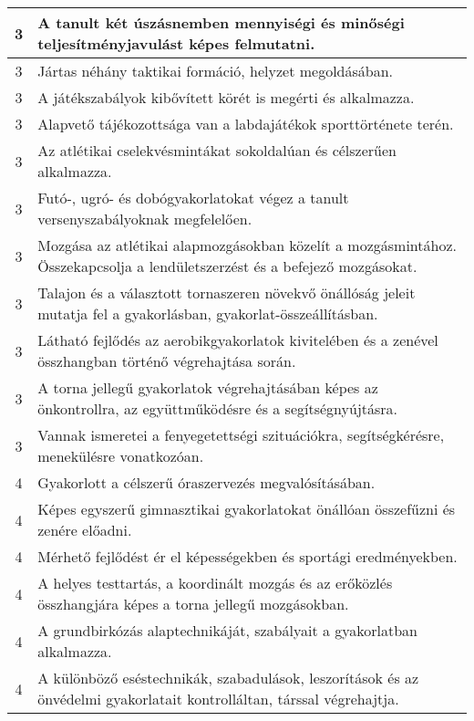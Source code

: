 \begin{longtable}{c | p{12cm} }
                                
                                          3 &  A tanult két úszásnemben mennyiségi és minőségi teljesítményjavulást képes felmutatni. \\ \hline
                                          3 &  Jártas néhány taktikai formáció, helyzet megoldásában. \\ \hline
                                          3 &  A játékszabályok kibővített körét is megérti és alkalmazza. \\ \hline
                                          3 &  Alapvető tájékozottsága van a labdajátékok sporttörténete terén. \\ \hline
                                          3 &  Az atlétikai cselekvésmintákat sokoldalúan és célszerűen alkalmazza. \\ \hline
                                          3 &  Futó-, ugró- és dobógyakorlatokat végez a tanult versenyszabályoknak megfelelően. \\ \hline
                                          3 &  Mozgása az atlétikai alapmozgásokban közelít a mozgásmintához. Összekapcsolja a lendületszerzést és a befejező mozgásokat. \\ \hline
                                          3 &  Talajon és a választott tornaszeren növekvő önállóság jeleit mutatja fel a gyakorlásban, gyakorlat-összeállításban. \\ \hline
                                          3 &  Látható fejlődés az aerobikgyakorlatok kivitelében és a zenével összhangban történő végrehajtása során. \\ \hline
                                          3 &  A torna jellegű gyakorlatok végrehajtásában képes az önkontrollra, az együttműködésre és a segítségnyújtásra. \\ \hline
                                          3 &  Vannak ismeretei a fenyegetettségi szituációkra, segítségkérésre, menekülésre vonatkozóan. \\ \hline
                                      
                                
                                          4 &  Gyakorlott a célszerű óraszervezés megvalósításában. \\ \hline
                                          4 &  Képes egyszerű gimnasztikai gyakorlatokat önállóan összefűzni és zenére előadni. \\ \hline
                                          4 &  Mérhető fejlődést ér el képességekben és sportági eredményekben. \\ \hline
                                          4 &  A helyes testtartás, a koordinált mozgás és az erőközlés összhangjára képes a torna jellegű mozgásokban. \\ \hline
                                          4 &  A grundbirkózás alaptechnikáját, szabályait a gyakorlatban alkalmazza. \\ \hline
                                          4 &  A különböző eséstechnikák, szabadulások, leszorítások és az önvédelmi gyakorlatait kontrolláltan, társsal végrehajtja. \\ \hline
                                      

\end{longtable}
